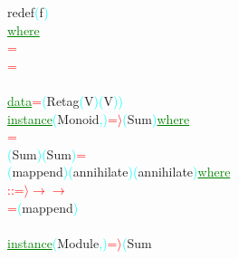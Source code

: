 {\rm{}redef}\hsspace \textcolor{cyan}{(}{\rm{}f}\textcolor{cyan}{)}\\\hstab \hstab \textcolor{green}{\underline{where}}\\\hstab {}\hsspace \textcolor{red}{=}\hsspace {}\\\hstab {}\hsspace \textcolor{red}{=}\\\\\textcolor{green}{\underline{data}}\hsspace \textcolor{red}{=}\hsspace \textcolor{cyan}{(}{\rm{}Retag}\hsspace \textcolor{cyan}{(}{\rm{}V}\textcolor{cyan}{)}\hsspace \textcolor{cyan}{(}{\rm{}V}\textcolor{cyan}{)}\textcolor{cyan}{)}\\\textcolor{green}{\underline{instance}}\hsspace \textcolor{cyan}{(}{\rm{}Monoid}\textcolor{cyan}{,}\textcolor{cyan}{)}\hsspace \textcolor{red}{=\ensuremath{\rangle}}\hsspace \textcolor{cyan}{(}{\rm{}Sum}\textcolor{cyan}{)}\hsspace \textcolor{green}{\underline{where}}\\\hsspace \textcolor{red}{=}\\\hsspace \textcolor{cyan}{(}{\rm{}Sum}\textcolor{cyan}{)}\hsspace \textcolor{cyan}{(}{\rm{}Sum}\textcolor{cyan}{)}\hsspace \textcolor{red}{=}\\\hstab {}\hsspace \textcolor{cyan}{(}{\rm{}mappend}\textcolor{cyan}{)}\hsspace \textcolor{cyan}{(}{\rm{}annihilate}\textcolor{cyan}{)}\hsspace \textcolor{cyan}{(}{\rm{}annihilate}\textcolor{cyan}{)}\hsspace \textcolor{green}{\underline{where}}\\\hstab {}\hsspace \textcolor{red}{::}\hsspace \textcolor{red}{=\ensuremath{\rangle}}\hsspace \textcolor{red}{\ensuremath{\rightarrow}}\hsspace \textcolor{red}{\ensuremath{\rightarrow}}\\\hstab {}\hsspace \textcolor{red}{=}\hsspace \textcolor{cyan}{(}{\rm{}mappend}\textcolor{cyan}{)}\\\\\textcolor{green}{\underline{instance}}\hsspace \textcolor{cyan}{(}{\rm{}Module}\textcolor{cyan}{,}\textcolor{cyan}{)}\hsspace \textcolor{red}{=\ensuremath{\rangle}}\hsspace \textcolor{cyan}{(}{\rm{}Sum}\hsspace 